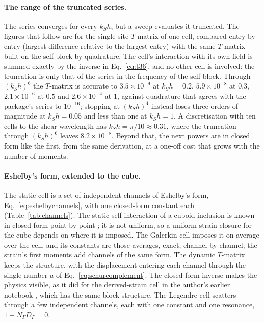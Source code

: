 \documentclass[11pt,a4paper]{article}
\begin{document}
\paragraph{The range of the truncated series.} The series converges for every $k_Sh$, but a sweep
evaluates it truncated. The figures that follow are for the single-site $T$-matrix of one cell, compared entry
by entry (largest difference relative to the largest entry) with the same $T$-matrix built on the self block
by quadrature. The cell's interaction with its own field is summed exactly by the inverse in
Eq.~\eqref{eq:t36}, and no other cell is involved: the truncation is only that of the series in the frequency
of the self block. Through $(k_Sh)^6$ the $T$-matrix is accurate to $3.5\times10^{-9}$ at $k_Sh=0.2$,
$5.9\times10^{-8}$ at $0.3$, $2.1\times10^{-6}$ at $0.5$ and $2.6\times10^{-4}$ at $1$, against quadrature
that agrees with the package's series to $10^{-16}$; stopping at $(k_Sh)^4$ instead loses three orders of
magnitude at $k_Sh=0.05$ and less than one at $k_Sh=1$. A discretisation with ten cells to the shear
wavelength has $k_Sh=\pi/10\approx0.31$, where the truncation through $(k_Sh)^6$ leaves $8.2\times10^{-8}$. Beyond that, the next powers are in closed form like the
first, from the same derivation, at a one-off cost that grows with the number of moments.

\paragraph{Eshelby's form, extended to the cube.} The static cell is a set of independent channels of
Eshelby's form, Eq.~\eqref{eq:eshelbychannels}, with one closed-form constant each (Table~\ref{tab:channels}).
The static self-interaction of a cuboid inclusion is known in closed form point by point
\citep{Chiu1977,Nozaki2001}; it is not uniform, so a uniform-strain closure for the cube depends on where it is
imposed. The Galerkin cell imposes it on average over the cell, and its constants are those averages, exact,
channel by channel; the strain's first moments add channels of the same form. The dynamic $T$-matrix keeps the structure, with the displacement entering each
channel through the single number $a$ of Eq.~\eqref{eq:schurcomplement}. The closed-form inverse makes the physics
visible, as it did for the derived-strain cell in the author's earlier notebook \citep{NestorNotebooks2012},
which has the same block structure.
The Legendre cell scatters through a
few independent channels, each with one constant and one resonance, $1-N_\Gamma D_\Gamma=0$.
\end{document}
